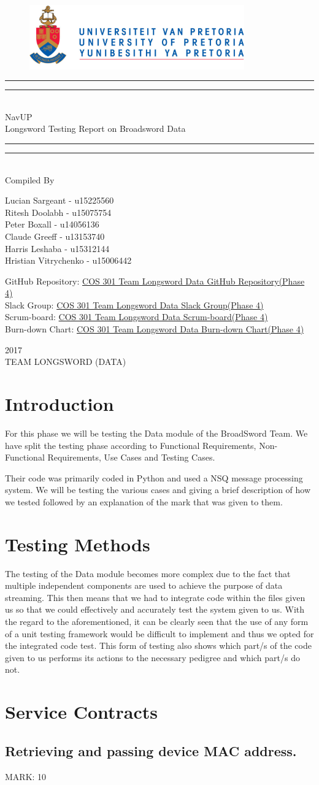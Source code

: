 \documentclass{article}
\newcommand*{\titleGP}{\begingroup
		\begin{figure}[t]
			\centering
			\includegraphics[width=350px]{UP_Logo.PNG}
		\end{figure}
\centering 
\vspace*{\baselineskip}

\rule{\textwidth}{1.6pt}\vspace*{-\baselineskip}\vspace*{2pt}
\rule{\textwidth}{0.4pt}\\[\baselineskip]

{\LARGE NavUP\\ [0.3\baselineskip] Longsword Testing Report on Broadsword Data } \\ [0.2\baselineskip]
\rule{\textwidth}{0.4pt}\vspace*{-\baselineskip}\vspace{3.2pt}
\rule{\textwidth}{1.6pt}\\[\baselineskip] %



Compiled By \\[\baselineskip]
{\Large Lucian Sargeant - u15225560 \\ Ritesh Doolabh - u15075754 \\ Peter Boxall -  u14056136 \\ Claude Greeff - u13153740\\ Harris Leshaba - u15312144 \\ Hristian Vitrychenko - u15006442\par}

\bigskip
\bigskip

 	GitHub Repository:  
 	\href{https://github.com/Chris19951225/COS-301-Longsword-Data-Streaming}{COS 301 Team Longsword Data GitHub Repository(Phase 4)}
\\
 	Slack Group:  
 	\href{https://cos301longsworddata.slack.com/messages/C4JMSNZGE/}{COS 301 Team Longsword Data Slack Group(Phase 4)}
 	\\
 	Scrum-board:  
 	\href{https://waffle.io/Chris19951225/COS-301-Longsword-Data-Streaming}{COS 301 Team Longsword Data Scrum-board(Phase 4)}
 	\\
 	Burn-down Chart:  
 	\href{https://waffle.io/Chris19951225/COS-301-Longsword-Data-Streaming/metrics/burndown?milestone=Testing\%20Phase\%20Deadline}{COS 301 Team Longsword Data Burn-down Chart(Phase 4)}




 

\vfill


{\scshape 2017} \\[0.3\baselineskip]
{\large TEAM LONGSWORD (DATA)}\par

\endgroup}
\begin{document}
\titleGP
\newpage
\tableofcontents

\newpage

\section{Introduction}
\begin{flushleft}
For this phase we will be testing the Data module of the BroadSword Team. We have split the testing phase according to Functional Requirements, Non-Functional Requirements, Use Cases and Testing Cases. 
\end{flushleft}

\begin{flushleft}
Their code was primarily coded in Python and used a NSQ message processing system.
We will be testing the various cases and giving a brief description of how we tested followed by an explanation of the mark that was given to them.
\end{flushleft}

\section{Testing Methods}
\begin{flushleft}
The testing of the Data module becomes more complex due to the fact that multiple independent components are used to achieve the purpose of data streaming. This then means that we had to integrate code within the files given us so that we could effectively and accurately test the system given to us. With the regard to the aforementioned, it can be clearly seen that the use of any form of a unit testing framework would be difficult to implement and thus we opted for the integrated code test. This form of testing also shows which part/s of the code given to us performs its actions to the necessary pedigree and which part/s do not.
\end{flushleft}

\newpage
\section{Service Contracts}

\subsection{Retrieving and passing device MAC address.}
\begin{flushleft}
MARK: 10
\end{flushleft}
\end{document}
